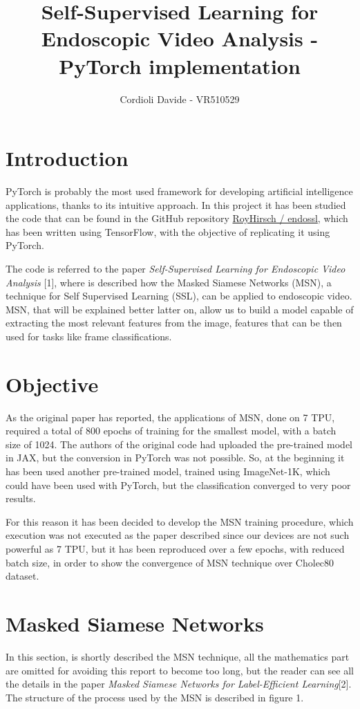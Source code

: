\documentclass[column]{article}
\title{Self-Supervised Learning for Endoscopic Video Analysis - PyTorch implementation}
\author{Cordioli Davide - VR510529}
\begin{document}
	
	\maketitle
	
	\begin{multicols}{2}
		
	\section{Introduction}
	
	PyTorch is probably the most used framework for developing artificial intelligence applications, thanks to its intuitive approach. In this project it has been studied the code that can be found in the GitHub repository  \href{https://github.com/royhirsch/endossl}{RoyHirsch / endossl}, which has been written using TensorFlow, with the objective of replicating it using PyTorch.
	
	The code is referred to the paper \textit{Self-Supervised Learning for Endoscopic Video Analysis} [1], where is described how the Masked Siamese Networks (MSN), a technique for Self Supervised Learning (SSL), can be applied to endoscopic video. MSN, that will be explained better latter on, allow us to build a model capable of extracting the most relevant features from the image, features that can be then used for tasks like frame classifications.
	
	\section{Objective}
	
	As the original paper has reported, the applications of MSN, done on 7 TPU, required a total of 800 epochs of training for the smallest model, with a batch size of 1024. The authors of the original code had uploaded the pre-trained model in JAX, but the conversion in PyTorch was not possible. So, at the beginning it has been used another pre-trained model, trained using ImageNet-1K, which could have been used with PyTorch, but the classification converged to very poor results. 
	
	For this reason it has been decided to develop the MSN training procedure, which execution was not executed as the paper described since our devices are not such powerful as 7 TPU, but it has been reproduced over a few epochs, with reduced batch size, in order to show the convergence of MSN technique over Cholec80 dataset.
	
	
	\section{Masked Siamese Networks}
	In this section, is shortly described the MSN technique, all the mathematics part are omitted for avoiding this report to become too long, but the reader can see all the details in the paper \textit{Masked Siamese Networks for Label-Efficient Learning}[2]. The structure of the process used by the MSN is described in figure 1. 
	

\end{multicols}
\end{document}
